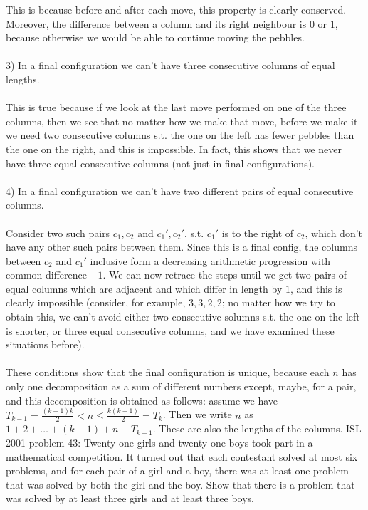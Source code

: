 This is because before and after each move, this property is clearly conserved. Moreover, the difference between a column and its right neighbour is $0$ or $1$, because otherwise we would be able to continue moving the pebbles. \\\\
3) In a final configuration we can't have three consecutive columns of equal lengths. \\\\
This is true because if we look at the last move performed on one of the three columns, then we see that no matter how we make that move, before we make it we need two consecutive columns s.t. the one on the left has fewer pebbles than the one on the right, and this is impossible. In fact, this shows that we never have three equal consecutive columns (not just in final configurations). \\\\
4) In a final configuration we can't have two different pairs of equal consecutive columns. \\\\
Consider two such pairs $c_1,c_2$ and $c_1',c_2'$, s.t. $c_1'$ is to the right of $c_2$, which don't have any other such pairs between them. Since this is a final config, the columns between $c_2$ and $c_1'$ inclusive form a decreasing arithmetic progression with common difference $-1$. We can now retrace the steps until we get two pairs of equal columns which are adjacent and which differ in length by $1$, and this is clearly impossible (consider, for example, $3,3,2,2$; no matter how we try to obtain this, we can't avoid either two consecutive solumns s.t. the one on the left is shorter, or three equal consecutive columns, and we have examined these situations before). \\\\
These conditions show that the final configuration is unique, because each $n$ has only one decomposition as a sum of different numbers except, maybe, for a pair, and this decomposition is obtained as follows: assume we have $T_{k-1}=\frac{(k-1)k}2<n\le \frac{k(k+1)}2=T_k$. Then we write $n$ as $1+2+\ldots+(k-1)+n-T_{k-1}$. These are also the lengths of the columns. 
ISL 2001 problem 43:  Twenty-one girls and twenty-one boys took part in a mathematical competition. It turned out that each contestant solved at most six problems, and for each pair of a girl and a boy, there was at least one problem that was solved by both the girl and the boy. Show that there is a problem that was solved by at least three girls and at least three boys. 

